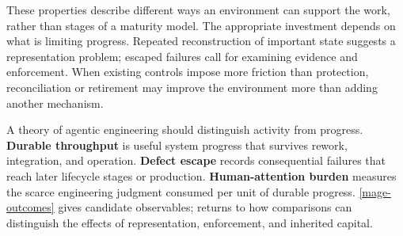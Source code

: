 These properties describe different ways an environment can support the work, rather than stages of a maturity model\citep{bollinger1991critical}. The appropriate investment depends on what is limiting progress. Repeated reconstruction of important state suggests a representation problem; escaped failures call for examining evidence and enforcement. When existing controls impose more friction than protection, reconciliation or retirement may improve the environment more than adding another mechanism.


A theory of agentic engineering should distinguish activity from progress. \textbf{Durable throughput} is useful system progress that survives rework, integration, and operation. \textbf{Defect escape} records consequential failures that reach later lifecycle stages or production. \textbf{Human-attention burden} measures the scarce engineering judgment consumed per unit of durable progress. \autoref{mage-outcomes} gives candidate observables;  returns to how comparisons can distinguish the effects of representation, enforcement, and inherited capital.

